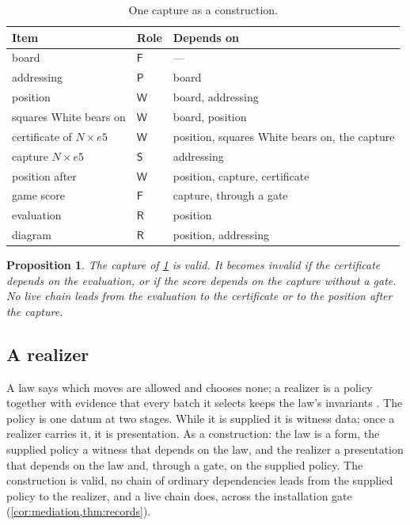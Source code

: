 \documentclass[11pt]{article}
\numberwithin{equation}{section}
\theoremstyle{definition}
\theoremstyle{plain}
\newtheorem{proposition}[definition]{Proposition}
\theoremstyle{remark}
\newcommand{\Frm}{\mathsf F}
\newcommand{\Prs}{\mathsf P}
\newcommand{\Wit}{\mathsf W}
\newcommand{\Scr}{\mathsf S}
\newcommand{\Ren}{\mathsf R}
\begin{document}
\begin{table}[ht]
\centering
\small
\begin{tabularx}{\textwidth}{@{}llX@{}}
\toprule
Item & Role & Depends on\\
\midrule
board & \(\Frm\) & ---\\
addressing & \(\Prs\) & board\\
position & \(\Wit\) & board, addressing\\
squares White bears on & \(\Wit\) & board, position\\
certificate of \(N{\times}e5\) & \(\Wit\) & position, squares White bears
on, the capture\\
capture \(N{\times}e5\) & \(\Scr\) & addressing\\
position after & \(\Wit\) & position, capture, certificate\\
game score & \(\Frm\) & capture, through a gate\\
evaluation & \(\Ren\) & position\\
diagram & \(\Ren\) & position, addressing\\
\bottomrule
\end{tabularx}
\caption{One capture as a construction.}
\label{tab:chess}
\end{table}

\begin{proposition}\label{prop:chess}
The capture of \cref{tab:chess} is valid.  It becomes invalid if the
certificate depends on the evaluation, or if the score depends on the capture
without a gate.  No live chain leads from the evaluation to the certificate
or to the position after the capture.
\end{proposition}

\subsection{A realizer}\label{sec:realizer}

A law says which moves are allowed and chooses none; a realizer is a policy
together with evidence that every batch it selects keeps the law's invariants
\cite[Def.~5.10]{Book}.  The policy is one datum at two stages.  While it is
supplied it is witness data; once a realizer carries it, it is presentation.
As a construction: the law is a form, the supplied policy a witness that
depends on the law, and the realizer a presentation that depends on the law
and, through a gate, on the supplied policy.  The construction is valid, no
chain of ordinary dependencies leads from the supplied policy to the
realizer, and a live chain does, across the installation gate
(\cref{cor:mediation,thm:records}).
\end{document}
